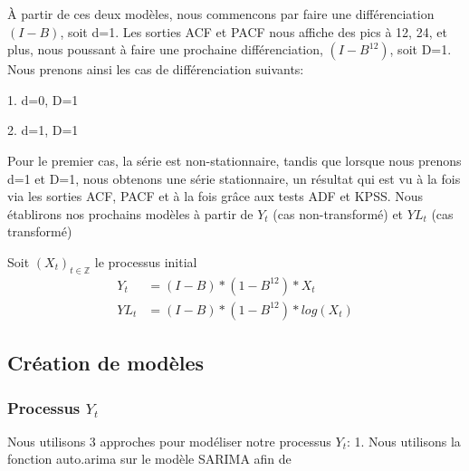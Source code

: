 \documentclass[12pt,a4paper]{book}
\newcommand{\1}{\mathds{1}}
\begin{document}
\vspace{5 mm}
À partir de ces deux modèles, nous commencons par faire une différenciation $(I-B)$, soit d=1. Les sorties ACF et PACF nous affiche des pics à 12, 24, et plus, nous poussant à faire une prochaine différenciation, $(I-B^{12})$, soit D=1. Nous prenons ainsi les cas de différenciation suivants:
\begin{description}
  \item 1. d=0, D=1
  \item 2. d=1, D=1
\end{description}
\noindent 
Pour le premier cas, la série est non-stationnaire, tandis que lorsque nous prenons d=1 et D=1, nous obtenons une série stationnaire, un résultat qui est vu à la fois via les sorties ACF, PACF et à la fois grâce aux tests ADF et KPSS. Nous établirons nos prochains modèles à partir de $Y_t$ (cas non-transformé) et $YL_t$ (cas transformé)

\noindent 
Soit $(X_t)_{t\in \mathbb{Z}}$ le processus initial
\begin{align*}
Y_t &= (I-B) * (1-B^{12}) * X_t \\ 
YL_t &= (I-B) * (1-B^{12}) * log(X_t)
\end{align*}



\vspace{5 mm}
\subsection{Création de modèles}

\vspace{5 mm}
\subsubsection{Processus $Y_t$}

Nous utilisons 3 approches pour modéliser notre processus $Y_t$:
1. Nous utilisons la fonction auto.arima sur le modèle SARIMA afin de
\end{document}
